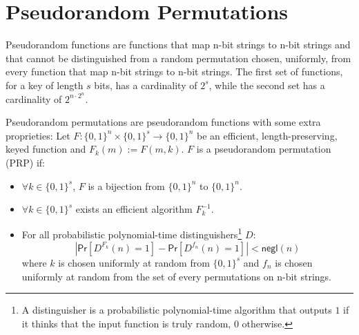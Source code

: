 \section{Pseudorandom Permutations}
Pseudorandom functions are functions that map n-bit strings to n-bit strings and that cannot be distinguished from a random permutation chosen, uniformly, from every function that map n-bit strings to n-bit strings.
The first set of functions, for a key of length $s$ bits, has a cardinality of $2^{s}$, while the second set has a cardinality of $2^{n\cdot2^n}$.\par
Pseudorandom permutations are pseudorandom functions with some extra proprieties:
Let $F : \{0,1\}^{n} \times \{0,1\}^{s} \rightarrow \{0,1\}^{n}$ be an efficient, length-preserving, keyed function and $F_k(m) := F(m, k)$.
$F$ is a pseudorandom permutation (PRP) if:
\begin{itemize}
    \item{$\forall k \in \{0,1\}^{s}$, $F$ is a bijection from $\{0,1\}^{n}$ to $\{0,1\}^{n}$}.
    \item{$\forall k \in \{0,1\}^{s}$ exists an efficient algorithm $F^{-1}_k$.}
    \item{For all probabilistic polynomial-time distinguishers\footnote{A distinguisher is a probabilistic polynomial-time algorithm that outputs $1$ if it thinks that the input function is truly random, $0$ otherwise.} $D$:
        $$
            |\mathsf{Pr}[D^{F_k}(n) = 1] - \mathsf{Pr}[D^{f_n}(n) = 1]| < \mathsf{negl}(n)
        $$
        where $k$ is chosen uniformly at random from $\{0,1\}^{s}$ and $f_n$ is chosen uniformly at random from the set of every permutations on n-bit strings.
        }
\end{itemize}


